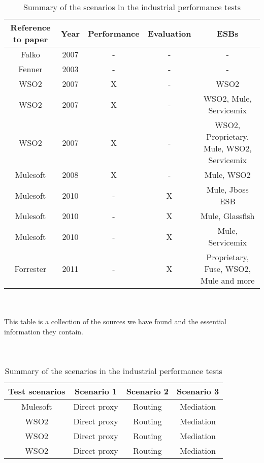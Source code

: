 \begin{table}[H]
	\caption{Summary of industrial papers and what tests they perform}
	\begin{tabular}{c c c c c}

		Reference to paper & Year & Performance & Evaluation & ESBs \\ 
		\hline	
		Falko \cite{falko07} & 2007 & - & - & - \\ 
		Fenner \cite{fenner03} & 2003 & - & - & - \\
		WSO2 \cite{Perera07} & 2007 & X & - & WSO2 \\
		WSO2 \cite{Perera07R2} & 2007 & X & - & WSO2, Mule, Servicemix\\
		WSO2 \cite{Perera07R3} & 2007 & X & - & WSO2, Proprietary, Mule, WSO2, Servicemix \\
		Mulesoft \cite{mulesoft08} & 2008 & X & - & Mule, WSO2\\
		Mulesoft \cite{mulevsjboss} & 2010 & - & X & Mule, Jboss ESB\\
		Mulesoft \cite{mulevsglassfish} & 2010 & - & X & Mule, Glassfish \\
		Mulesoft \cite{mulevsservicemix} & 2010 & - & X & Mule, Servicemix \\
		Forrester \cite{forrester11} & 2011 & - & X & Proprietary, Fuse, WSO2, Mule and more\\
		\hline
	\end{tabular}
	\\
	\\
	This table is a collection of the sources we have found and the essential information they contain.
	\\
	\\
	\\
	\caption{Summary of the scenarios in the industrial performance tests}
	\begin{tabular}{c c c c}
		\hline
		Test scenarios & Scenario 1 & Scenario 2 & Scenario 3 \\
		\hline
		Mulesoft \cite{mulesoft08} & Direct proxy & Routing & Mediation \\	
		WSO2 \cite{Perera07} & Direct proxy & Routing & Mediation \\
		WSO2 \cite{Perera07R2} & Direct proxy & Routing & Mediation \\
		WSO2 \cite{Perera07R3} & Direct proxy & Routing & Mediation \\
		\hline
	\end{tabular}
	\\
	\\

\end{table}
